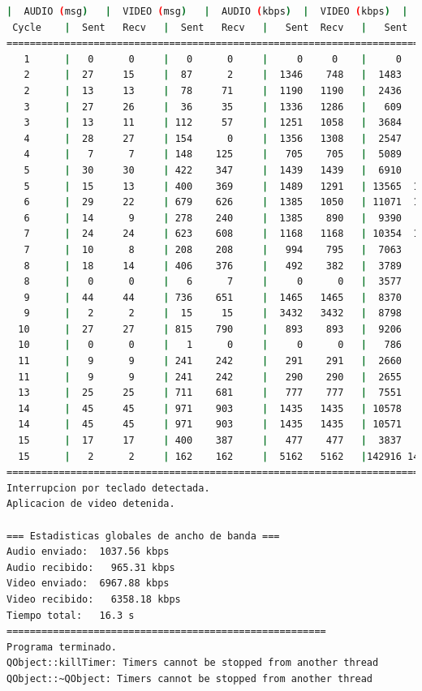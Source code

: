 \begin{lstlisting}[language=bash,basicstyle=\ttfamily\scriptsize]
          |  AUDIO (msg)   |  VIDEO (msg)   |  AUDIO (kbps)  |  VIDEO (kbps)  |   CPU (%)
 Cycle    |  Sent   Recv   |  Sent   Recv   |   Sent  Recv   |   Sent  Recv   | Program System
============================================================================================
   1      |   0      0     |   0      0     |     0     0    |     0     0    |   0      0
   2      |  27     15     |  87      2     |  1346    748   |  1483     34   |  30     76
   2      |  13     13     |  78     71     |  1190   1190   |  2436   2223   |  41     82
   3      |  27     26     |  36     35     |  1336   1286   |   609    592   |  27     88
   3      |  13     11     | 112     57     |  1251   1058   |  3684   1869   |  29     90
   4      |  28     27     | 154      0     |  1356   1308   |  2547      0   |  45     74
   4      |   7      7     | 148    125     |   705    705   |  5089   4303   |  49     64
   5      |  30     30     | 422    347     |  1439   1439   |  6910   5683   |  40     78
   5      |  15     13     | 400    369     |  1489   1291   | 13565  12506   |  45     86
   6      |  29     22     | 679    626     |  1385   1050   | 11071  10209   |  39     88
   6      |  14      9     | 278    240     |  1385    890   |  9390   8104   |  39     88
   7      |  24     24     | 623    608     |  1168   1168   | 10354  10104   |  50     85
   7      |  10      8     | 208    208     |   994    795   |  7063   7063   |  45     85
   8      |  18     14     | 406    376     |   492    382   |  3789   3508   |  43     34
   8      |   0      0     |   6      7     |     0      0   |  3577   4173   |  53     43
   9      |  44     44     | 736    651     |  1465   1465   |  8370   7402   |  34     85
   9      |   2      2     |  15     15     |  3432   3432   |  8798   8685   |   0     85
  10      |  27     27     | 815    790     |   893    893   |  9206   8923   |  43     81
  10      |   0      0     |   1      0     |     0      0   |   786      0   |   0     81
  11      |   9      9     | 241    242     |   291    291   |  2660   2673   |  38     16
  11      |   9      9     | 241    242     |   290    290   |  2655   2668   |  38     18
  13      |  25     25     | 711    681     |   777    777   |  7551   7234   |  43     66
  14      |  45     45     | 971    903     |  1435   1435   | 10578   9836   |  32     91
  14      |  45     45     | 971    903     |  1435   1435   | 10571   9830   |  32     91
  15      |  17     17     | 400    387     |   477    477   |  3837   3714   |  37     42
  15      |   2      2     | 162    162     |  5162   5162   |142916 142746   |   0     52
============================================================================================
Interrupcion por teclado detectada.
Aplicacion de video detenida.

=== Estadisticas globales de ancho de banda ===
Audio enviado:	1037.56 kbps
Audio recibido:   965.31 kbps
Video enviado:	6967.88 kbps
Video recibido:   6358.18 kbps
Tiempo total: 	16.3 s
=======================================================
Programa terminado.
QObject::killTimer: Timers cannot be stopped from another thread
QObject::~QObject: Timers cannot be stopped from another thread
\end{lstlisting}
